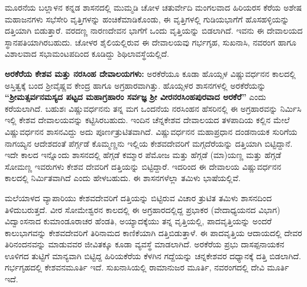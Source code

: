 \vskip 3pt

ಮೂರನೆಯ ಬಲ್ಲಾಳನ ಕನ್ನಡ ಶಾಸನದಲ್ಲಿ ಮುಮ್ಮಡಿ ಚೋಳ ಚತುರ್ವೇದಿ ಮಂಗಲವಾದ ಹಿರಿಯರಸ ಕೆರೆಯ ಅಶೇಷ ಮಹಾಜನಗಳು ಸಭೆಸೇರಿ ವೃತ್ತಿಗಳನ್ನು ಹಂಚಿಕೆಮಾಡಿಕೊಂಡು, ಈ ವೃತ್ತಿಗಳಲ್ಲಿ ಗುಡಿಯಭಾಗೆಗೆ ಹೊಸಹಳ್ಳಿಯನ್ನು ದತ್ತಿಯಾಗಿ ಬಿಡುತ್ತಾರೆ. ವರದಣ್ಣ ನಾರಣದೇವನ ಭಾಗೆಗೆ ಒಂದು ವೃತ್ತಿಯನ್ನು ಬಿಡಲಾಗಿದೆ. ಇವನು ಈ ದೇವಾಲಯದ ಸ್ಥಾನಪತಿಯಾಗಿರಬಹುದು. ಚೋಳರ ಶೈಲಿಯಲ್ಲಿರುವ ಈ ದೇವಾಲಯವು ಗರ್ಭಗೃಹ, ಸುಖನಾಸಿ, ನವರಂಗ ಹಾಗೂ ವಿಶಾಲವಾದ ಸಭಾಮಂಟಪದಿಂದ ಕೂಡಿದ್ದು ಶಿಥಿಲಾವಸ್ಥೆಯಲ್ಲಿದೆ.

\textbf{ಅರಕೆರೆಯ ಕೇಶವ ಮತ್ತು ನರಸಿಂಹ ದೇವಾಲಯಗಳು:} ಅರಕೆರೆಯೂ ಕೂಡಾ ಹೊಯ್ಸಳ ವಿಷ್ಣುವರ್ಧನನ ಕಾಲದಲ್ಲಿ ಅಸ್ತಿತ್ವಕ್ಕೆ ಬಂದ ಶ‍್ರೀವೈಷ್ಣವ ಕೇಂದ್ರ ಹಾಗೂ ಅಗ್ರಹಾರವಾಗಿತ್ತು. ಹೊಯ್ಸಳರ ಶಾಸನಗಳಲ್ಲಿ ಅರಕೆರೆಯನ್ನು \textbf{“ಶ‍್ರೀಮತ್ಸರ್ವನಮಸ್ಯದ ಪಟ್ಟದ ಮಹಾಗ್ರಹಾರಂ ಸರ್ವಜ್ಞ ಶ‍್ರೀ ವೀರನರಸಿಂಹಪುರವಾದ ಅರಕೆರೆ”} ಎಂದು ಕರೆಯಲಾಗಿದೆ. ಬಹುಶಃ ವಿಷ್ಣುವರ್ಧನನು ತನ್ನ ಮಗ ಒಂದನೆಯ ನರಸಿಂಹನ ಹೆಸರಿನಲ್ಲಿ ಈ ಅಗ್ರಹಾರವನ್ನು ನಿರ್ಮಿಸಿ ಇಲ್ಲಿ ಕೇಶವ ದೇವಾಲಯವನ್ನು ಕಟ್ಟಿಸಿರಬಹುದು. ಇಂದಿನ ಚೆನ್ನಕೇಶವ ದೇವಾಲಯದ ತಳಪಾದಿಯ ಕಲ್ಲಿನ ಮೇಲೆ ವಿಷ್ಣುವರ್ಧನನ ಶಾಸನವಿದ್ದು ಅದು ಪೂರ್ಣತ್ರುಟಿತವಾಗಿದೆ. ವಿಷ್ಣುವರ್ಧನನ ಮಹಾಪ್ರಧಾನ ದಂಡನಾಯಕ ಸುರಿಗೆಯ ನಾಗಯ್ಯನ ಆದೇಶದಂತೆ ಪೆರ್ಗ್ಗಡೆ ಕೊಮ್ಮಣ್ಣನು ಇಲ್ಲಿಯ ಕೇಶವದೇವರಿಗೆ ಮಗ್ಗದೆರೆಯನ್ನು ದತ್ತಿಯಾಗಿ ಬಿಟ್ಟಿದ್ದಾನೆ. ಇದೇ ಕಾಲದ ಇನ್ನೊಂದು ಶಾಸನದಲ್ಲಿ ಹೆಗ್ಗಡೆ ಕಮ್ಮಾರ ಪೆಮೋಜ ಮತ್ತು ಹೆಗ್ಗಡೆ (ಮಾ)ಯಣ್ಣ ಮತ್ತು ಹೆಗ್ಗಡೆ ಸೋಮಣ್ಣ ಇವರುಗಳು ಕೇಶವ ದೇವರಿಗೆ ದತ್ತಿಯನ್ನು ಬಿಟ್ಟಿದ್ದಾರೆ. ಇದರಿಂದ ಈ ದೇವಾಲಯ ವಿಷ್ಣುವರ್ಧನನ ಕಾಲದಲ್ಲಿ ನಿರ್ಮಿತವಾಗಿದೆ ಎಂದು ಹೇಳಬಹುದು. ಈ ಶಾಸನಗಳೆಲ್ಲಾ ತಮಿಳು ಭಾಷೆಯಲ್ಲಿವೆ.

ಮಲೆಯಾಳದ ವ್ಯಾಪಾರಿಯು ಕೇಶವದೇವರಿಗೆ ದತ್ತಿಯನ್ನು ಬಿಟ್ಟಿರುವ ವಿಚಾರ ತ್ರುಟಿತ ತಮಿಳು ಶಾಸನದಿಂದ ತಿಳಿದುಬರುತ್ತದೆ. ವೀರ ಸೋಮೇಶ್ವರನ ಕಾಲದಲ್ಲಿ ಈ ಅಗ್ರಹಾರದಲ್ಲಿದ್ದ ಪ್ರಭಾಕರ (ವೇದಾಧ್ಯಯನದ ವಿಭಾಗ) ವಿದ್ವಾಂಸನಾದ ಕುಮಾಂಡೂರಾಚರ ಹೆಂಡತಿ, ಅಯ್ಯಾದಕ್ಕೆಯು ತನ್ನ ವೃತ್ತಿಯಲ್ಲಿ, ಪಾದವೃತ್ತಿಯನ್ನು ಅಂದರೆ ಕಾಲುಭಾಗವನ್ನು ಕೇಶವದೇವರಿಗೆ ತಿರಿನಾಮದ ಕಾಣಿಕೆಯಾಗಿ ದತ್ತಿಬಿಡುತ್ತಾಳೆ. ಈ ಪಾದವೃತ್ತಿಯ ಆದಾಯದಲ್ಲಿ ದೇವರ ತಿರಿನಂದನವನ್ನು ಮಾಡುವವರ ಜೀವಿತಕ್ಕೂ ಕೂಡಾ ವ್ಯವಸ್ಥೆ ಮಾಡಲಾಗಿದೆ. ಅರಕೆರೆಯ ಪ್ರಭು ದಾಸಪ್ಪನಾಯಕನ ಊಳಿಗದ ತುಟ್ಟಿಗೆ ಮಾನ್ಯವಾಗಿ ಬಿಟ್ಟಿದ್ದ ಹಿರಿಯಕೆರೆಯ ಕೆಳಗಿನ ಗದ್ದೆಯನ್ನು ಚನ್ನಕೇಶವರ ದಧ್ಯಾನಕ್ಕೆ ದತ್ತಿ ಬಿಡಲಾಗಿದೆ. ಗರ್ಭಗೃಹದಲ್ಲಿ ಕೇಶವನಮೂರ್ತಿ ಇದೆ. ಸುಖನಾಸಿಯಲ್ಲಿ ರಾಮಾನುಜರ ಮೂರ್ತಿ, ನವರಂಗದಲ್ಲಿ ದೇವಿ ಮೂರ್ತಿ ಇದೆ.

